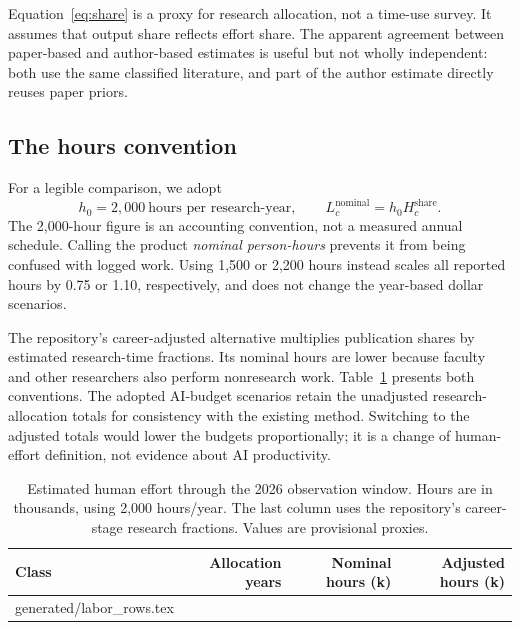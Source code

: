 \documentclass[11pt,letterpaper]{article}
\makeatletter
\let\inputrows\@@input
\makeatother
\begin{document}
Equation~\eqref{eq:share} is a proxy for research allocation, not a time-use survey. It assumes that output share reflects effort share. The apparent agreement between paper-based and author-based estimates is useful but not wholly independent: both use the same classified literature, and part of the author estimate directly reuses paper priors.

\subsection{The hours convention}
For a legible comparison, we adopt
\begin{equation}
 h_0=2{,}000\ \text{hours per research-year},\qquad
 L^{\mathrm{nominal}}_c=h_0 H^{\mathrm{share}}_c.
 \label{eq:hours}
\end{equation}
The 2,000-hour figure is an accounting convention, not a measured annual schedule. Calling the product \emph{nominal person-hours} prevents it from being confused with logged work. Using 1,500 or 2,200 hours instead scales all reported hours by 0.75 or 1.10, respectively, and does not change the year-based dollar scenarios.

The repository's career-adjusted alternative multiplies publication shares by estimated research-time fractions. Its nominal hours are lower because faculty and other researchers also perform nonresearch work. Table~\ref{tab:labor} presents both conventions. The adopted AI-budget scenarios retain the unadjusted research-allocation totals for consistency with the existing method. Switching to the adjusted totals would lower the budgets proportionally; it is a change of human-effort definition, not evidence about AI productivity.

\begin{table}[htbp]
\centering\small
\caption{Estimated human effort through the 2026 observation window. Hours are in thousands, using 2,000 hours/year. The last column uses the repository's career-stage research fractions. Values are provisional proxies.}
\label{tab:labor}
\begin{tabular}{lrrr}\toprule
Class & Allocation years & Nominal hours (k) & Adjusted hours (k)\\\midrule
\inputrows generated/labor_rows.tex
\bottomrule\end{tabular}
\end{table}
\end{document}
